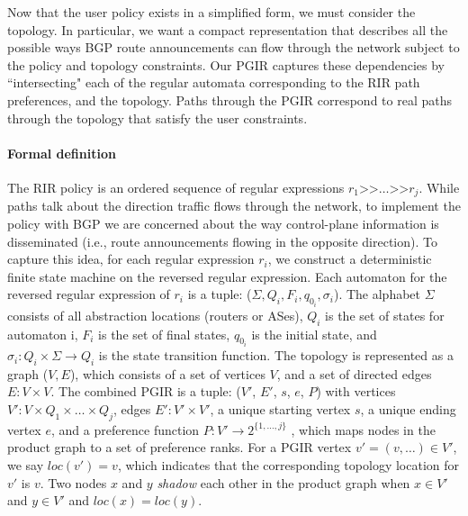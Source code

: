 \documentclass[10pt]{sigalternate052015}
\newcommand{\para}[1]{\paragraph*{\textbf{#1}}}
\newcommand{\set}[1]{\ensuremath{\{ #1 \} }}
\newcommand{\Prefer}{\texttt{>>}}
\begin{document}
Now that the user policy exists in a simplified form, we must consider the topology. In particular, we want a compact representation that describes all the possible ways BGP route announcements can flow through the network subject to the policy and topology constraints. Our PGIR captures these dependencies by ``intersecting" each of the regular automata corresponding to the RIR path preferences, and the topology. Paths through the PGIR correspond to real paths through the topology that satisfy the user constraints.


\para{Formal definition}

The RIR policy is an ordered sequence of regular expressions $r_1 \Prefer \dots \Prefer r_j$. While paths talk about the direction traffic flows through the network, to implement the policy with BGP we are concerned about the way control-plane information is disseminated (i.e., route announcements flowing in the opposite direction). To capture this idea, for each regular expression $r_i$, we construct a deterministic finite state machine on the reversed regular expression. Each automaton for the reversed regular expression of $r_i$ is a tuple: ($\Sigma, Q_i, F_i, q_{0_i}, \sigma_i$). The alphabet $\Sigma$ consists of all abstraction locations (routers or ASes), $Q_i$ is the set of states for automaton i, $F_i$ is the set of final states, $q_{0_i}$ is the initial state, and $\sigma_i \colon Q_i \times \Sigma \rightarrow Q_i$ is the state transition function.
%
The topology is represented as a graph ($V, E$), which consists of a set of vertices $V$, and a set of directed edges $E \colon V \times V$.
%
The combined PGIR is a tuple: ($V'$, $E'$, $s$, $e$, $P$) with
vertices $V' \colon V \times Q_1 \times \dots \times Q_j$,
edges $E' \colon V' \times V'$,
a unique starting vertex $s$,
a unique ending vertex $e$,
and a preference function $P \colon V' \rightarrow 2^{\set{1, \dots, j}}$ , which maps nodes in the product graph to a set of preference ranks.
For a PGIR vertex $v' = (v, \dots) \in V'$, we say $loc(v') = v$, which indicates that the corresponding topology location for $v'$ is $v$. 
Two nodes $x$ and $y$ \emph{shadow} each other in the product graph when $x \in V'$ and $y \in V'$ and $loc(x) = loc(y)$.
\end{document}
